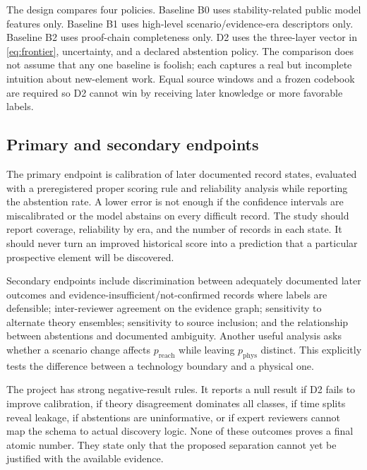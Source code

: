 \documentclass[conference]{IEEEtran}
\begin{document}
The design compares four policies. Baseline B0 uses stability-related public model features only. Baseline B1 uses high-level scenario/evidence-era descriptors only. Baseline B2 uses proof-chain completeness only. D2 uses the three-layer vector in \eqref{eq:frontier}, uncertainty, and a declared abstention policy. The comparison does not assume that any one baseline is foolish; each captures a real but incomplete intuition about new-element work. Equal source windows and a frozen codebook are required so D2 cannot win by receiving later knowledge or more favorable labels.

\subsection{Primary and secondary endpoints}

The primary endpoint is calibration of later documented record states, evaluated with a preregistered proper scoring rule and reliability analysis while reporting the abstention rate. A lower error is not enough if the confidence intervals are miscalibrated or the model abstains on every difficult record. The study should report coverage, reliability by era, and the number of records in each state. It should never turn an improved historical score into a prediction that a particular prospective element will be discovered.

Secondary endpoints include discrimination between adequately documented later outcomes and evidence-insufficient/not-confirmed records where labels are defensible; inter-reviewer agreement on the evidence graph; sensitivity to alternate theory ensembles; sensitivity to source inclusion; and the relationship between abstentions and documented ambiguity. Another useful analysis asks whether a scenario change affects $p_{\mathrm{reach}}$ while leaving $p_{\mathrm{phys}}$ distinct. This explicitly tests the difference between a technology boundary and a physical one.

The project has strong negative-result rules. It reports a null result if D2 fails to improve calibration, if theory disagreement dominates all classes, if time splits reveal leakage, if abstentions are uninformative, or if expert reviewers cannot map the schema to actual discovery logic. None of these outcomes proves a final atomic number. They state only that the proposed separation cannot yet be justified with the available evidence.
\end{document}
